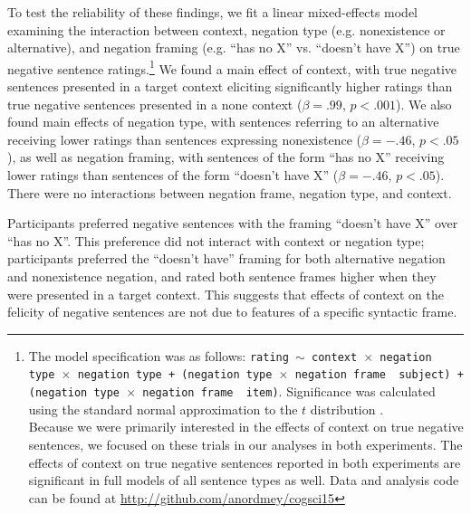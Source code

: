 \documentclass[10pt,letterpaper]{article}
\begin{document}

 
To test the reliability of these findings, we fit a linear mixed-effects model examining the interaction between context, negation type (e.g. nonexistence or alternative), and negation framing (e.g. ``has no X'' vs. ``doesn't have X'') on true negative sentence ratings.\footnote{ The model specification was as follows: \texttt{rating $\sim$ context~$\times$~negation type~$\times$~negation type + (negation type~$\times$~negation frame~\textbar~subject) +  (negation type~$\times$~negation frame~\textbar~item)}.  Significance was calculated using the standard normal approximation to the $t$ distribution \cite{barr2013}. \\  \indent Because we were primarily interested in the effects of context on true negative sentences, we focused on these trials in our analyses in both experiments.  The effects of context on true negative sentences reported in both experiments are significant in full models of all sentence types as well. Data and analysis code can be found at \href{http://github.com/anordmey/cogsci15}{http://github.com/anordmey/cogsci15}}  We found a main effect of context, with true negative sentences presented in a target context eliciting significantly higher ratings than true negative sentences presented in a none context ($\beta= .99$, $p< .001$).  We also found main effects of negation type, with sentences referring to an alternative receiving lower ratings than sentences expressing nonexistence ($\beta= -.46$, $p< .05$), as well as negation framing, with sentences of the form ``has no X'' receiving lower ratings than sentences of the form ``doesn't have X''  ($\beta= -.46$, $p< .05$).  There were no interactions between negation frame, negation type, and context.  

Participants preferred negative sentences with the framing ``doesn't have X'' over ``has no X''.  This preference did not interact with context or negation type; participants preferred the ``doesn't have'' framing for both alternative negation and nonexistence negation, and rated both sentence frames higher when they were presented in a target context.  This suggests that effects of context on the felicity of negative sentences are not due to features of a specific syntactic frame.
\end{document}
